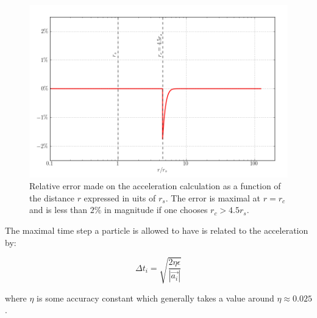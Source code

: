 \documentclass[a4paper,10pt]{report}
\begin{document}
\begin{figure}
\centering
\includegraphics[width=\textwidth]{Figures/Gravity/error}
\caption{Relative error made on the acceleration calculation as a function of the distance $r$ expressed in uits of $r_s$. The error is maximal at $r=r_c$ and is less than $2\%$ in magnitude if 
one chooses $r_c > 4.5 r_s$.} 
 \label{fig:total_error}
\end{figure}

The maximal time step a particle is allowed to have is related to the acceleration by:

\begin{equation}
 \Delta t_i = \sqrt{\frac{2\eta \epsilon}{|\vec{a_i}|}}
\end{equation}

where $\eta$ is some accuracy constant which generally takes a value around $\eta \approx 0.025$.
\end{document}
